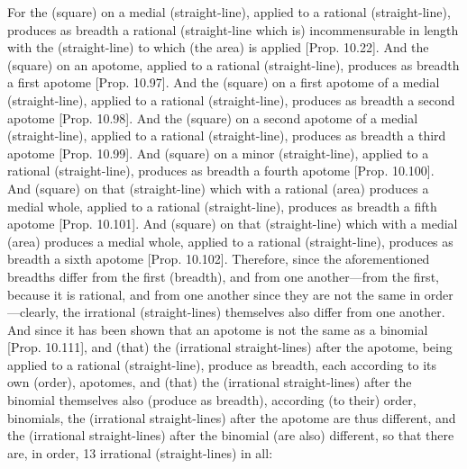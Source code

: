 \begin{Parallel}{}{}
{For the (square) on a medial (straight-line), applied to a rational (straight-line), produces as breadth a rational (straight-line which is) incommensurable in length with the
(straight-line) to which  (the area) is applied [Prop. 10.22]. And the (square) on an apotome, applied to a rational (straight-line), produces as breadth a first apotome [Prop. 10.97]. 
And the (square) on a first
apotome of a medial (straight-line), applied to a rational (straight-line),
produces as breadth a second apotome [Prop. 10.98].
And the (square) on a second
apotome of a medial (straight-line), applied to a rational (straight-line),
produces as breadth a third apotome [Prop. 10.99].
And (square) on a minor (straight-line), applied to a rational (straight-line),
produces as breadth a fourth apotome [Prop. 10.100]. And (square) on that (straight-line) which with a rational (area) produces a medial whole, applied to a rational (straight-line),
produces as breadth a fifth apotome [Prop. 10.101]. And (square) on that (straight-line) which with a medial (area) produces a medial whole, applied to a rational
 (straight-line), produces as breadth a sixth apotome [Prop. 10.102]. Therefore, since the aforementioned breadths differ from the first (breadth), and from one another---from the
first, because it is rational, and from one another since they are not the
same in order---clearly,  the  irrational (straight-lines)
themselves also differ from one another. And since it has been shown that an apotome
is not the same as a binomial [Prop. 10.111],
and (that) the (irrational straight-lines) after the apotome, being applied to
a rational (straight-line), produce as breadth, each according to its own (order), apotomes, and (that) the (irrational straight-lines) after
the binomial  themselves also (produce as breadth), according (to their) order, binomials, 
the (irrational straight-lines) after the apotome are thus different, and the
(irrational straight-lines) after the binomial (are also) different, so that
there are, in order, 13 irrational (straight-lines) in all:}
\end{Parallel}

